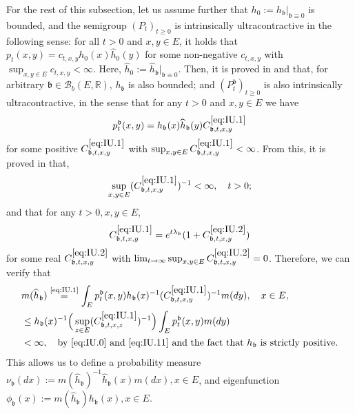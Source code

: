 \documentclass[12pt,a4paper]{amsart}
\numberwithin{equation}{section}
\theoremstyle{plain}
\theoremstyle{definition}
\theoremstyle{remark}
\newcounter{N}
\newcounter{n}[N]
\begin{document}
For the rest of this subsection, let us assume further that $h_0:= h_\mathfrak b|_{\mathfrak{b} \equiv 0}$ is bounded, and the semigroup $(P_t)_{t\geq 0}$ is intrinsically ultracontractive in the following sense: for all $t>0$ and $x, y \in E$, it holds that $p_t(x,y) = c_{t,x,y} h_0(x) \widehat h_0(y)$ for some non-negative $c_{t,x,y}$ with $\sup_{x,y \in E} c_{t,x,y}< \infty$.
Here, $\widehat h_0 := \widehat h_\mathfrak b|_{\mathfrak{b}\equiv 0}$.
Then, it is proved in \cite{RenSongZhang2015Limit} and \cite{RenSongZhang2017Central} that, for arbitrary $\mathfrak b \in \mathcal B_b(E,\mathbb R)$, $h_\mathfrak b$ is also bounded; and $(P_t^\mathfrak b)_{t\geq 0}$ is also intrinsically ultracontractive, in the sense that for any $t> 0$ and $x,y \in E$ we have \begin{equation}
\label{eq:IU.1} p^\mathfrak b_t(x,y) = h_\mathfrak b(x) \widehat h_\mathfrak b (y) C^{\eqref{eq:IU.1}}_{\mathfrak b,t,x,y}
\end{equation} 
for some positive $C^{\eqref{eq:IU.1}}_{\mathfrak b,t,x,y}$ with $\sup_{x,y \in E} C^{\eqref{eq:IU.1}}_{\mathfrak b,t,x,y}< \infty$.
From this, it is proved in \cite{KimSong2008Intrinsic} that, 
\begin{equation}
\label{eq:IU.11}\sup_{x,y \in E} (C^{\eqref{eq:IU.1}}_{\mathfrak b,t,x,y})^{-1}< \infty, \quad t>0;
\end{equation} 
and that for any $t>0, x,y \in E$,
\begin{equation}\label{eq:IU.2}  C^{\eqref{eq:IU.1}}_{\mathfrak b,t,x,y} = e^{t\lambda_\mathfrak{b}} (1+ C^{\eqref{eq:IU.2}}_{\mathfrak b,t,x,y})\end{equation}
for some real $C^{\eqref{eq:IU.2}}_{\mathfrak b,t,x,y}$ with $\lim_{t\to \infty} \sup_{x,y \in E} C^{\eqref{eq:IU.2}}_{\mathfrak b,t,x,y} =0$.
Therefore, we can verify that
\begin{align} 
& m(\widehat h_{\mathfrak b}) \overset{\text{\eqref{eq:IU.1}}}= \int_{E} p_t^\mathfrak{b}(x,y)h_\mathfrak{b}(x)^{-1} (C^{\eqref{eq:IU.1}}_{\mathfrak b,t,x,y})^{-1} m(dy), \quad x\in E,
\\&\leq  h_\mathfrak{b}(x)^{-1} \Big(\sup_{z\in E}(C^{\eqref{eq:IU.1}}_{\mathfrak b,t,x,z})^{-1}\Big)  \int_{E} p_t^\mathfrak{b}(x,y)m(dy) 
\\& < \infty,\quad\text{by \eqref{eq:IU.0} and \eqref{eq:IU.11} and the fact that $h_\mathfrak{b}$ is strictly positive}. 
\end{align}
This allows us to define a probability measure $\nu_\mathfrak b (dx):= m(\widehat h_{\mathfrak b})^{-1} \widehat h_\mathfrak b (x)m(dx), x\in E$, and eigenfunction
$\phi_\mathfrak{b}(x) := m(\widehat h_{\mathfrak b}) h_\mathfrak b(x), x\in E$.
\end{document}
